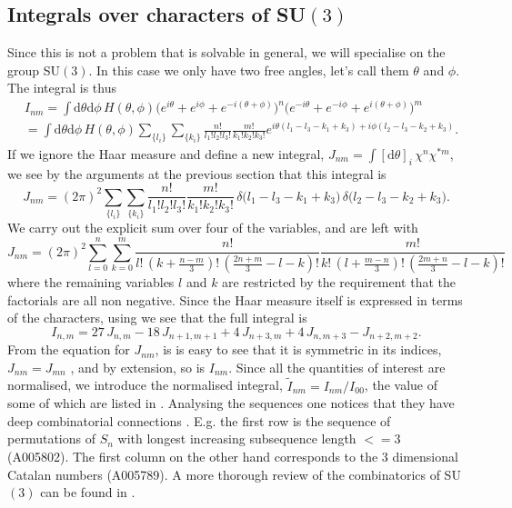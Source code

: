 \subsection{Integrals over characters of SU\texorpdfstring{$(3)$}{(3)}}

Since this is not a problem that is solvable in general, we will specialise on
the group SU$(3)$. In this case we only have two free angles, let's call them
$\theta$ and $\phi$. The integral is thus
%
\begin{align}
  &I_{nm} = \int \mathrm{d} \theta \mathrm{d} \phi \, H(\theta,\phi)
  \big(e^{i\theta} + e^{i\phi} + e^{-i(\theta + \phi)}\big)^n
  \big(e^{-i\theta} + e^{-i\phi} + e^{i(\theta + \phi)}\big)^m \nonumber\\
  &=\int \mathrm{d} \theta \mathrm{d} \phi \, H(\theta,\phi)
  \sum_{\{l_i\}} \sum_{\{k_i\}} \frac{n!}{l_1! l_2! l_3!} \frac{m!}{k_1! k_2!
    k_3!} e^{i \theta (l_1 - l_3 - k_1 + k_3) + i \phi (l_2 - l_3 - k_2 + k_3)}.
\end{align}
%
If we ignore the Haar measure and define a new integral, $J_{nm} = \int
[\mathrm{d} \theta]_i\, \chi^n \chi^{*m}$, we see by the arguments at the previous
section that this integral is
%
\begin{equation}
  J_{nm} = (2\pi)^2 \sum_{\{l_i\}} \sum_{\{k_i\}}
    \frac{n!}{l_1! l_2! l_3!} \frac{m!}{k_1! k_2!k_3!}\,
    \delta\big(l_1 - l_3 - k_1 + k_3\big)\, \delta\big(l_2 - l_3 - k_2 + k_3\big).
\end{equation}
%
We carry out the explicit sum over four of the variables, and are left
with
%
\begin{equation}
  J_{nm} = (2\pi)^2 \sum_{l = 0}^n \sum_{k = 0}^m
    \frac{n!}{l!\, (k + \frac{n-m}{3})!\,(\frac{2n+m}{3} - l - k)!}
    \frac{m!}{k!\, (l + \frac{m-n}{3})!\,(\frac{2m+n}{3} - l - k)!}
\end{equation}
%
where the remaining variables $l$ and $k$ are restricted by the requirement that
the factorials are all non negative. Since the Haar measure itself is expressed
in terms of the characters, using  we see that the
full integral is
%
\begin{equation}
  I_{n,m} = 27\, J_{n,m} - 18\, J_{n+1,m+1} + 4\, J_{n+3,m} + 4\, J_{n,m+3} - J_{n+2,m+2}.
\end{equation}
%
From the equation for $J_{nm}$, is is easy to see that it is symmetric in its
indices, $J_{nm} = J_{mn}$ , and by extension, so is $I_{nm}$. Since all the
quantities of interest are normalised, we introduce the normalised integral,
$\tilde{I}_{nm} = I_{nm} / I_{00}$, the value of some of which are listed in 
. Analysing the sequences one notices that they
have deep combinatorial connections \citep{OEIS}. E.g. the first row is the sequence of
permutations of $S_n$ with longest increasing subsequence length $<=3$
(A005802). The first column on the other hand corresponds to the 3 dimensional
Catalan numbers (A005789). A more thorough review of the combinatorics of
SU$(3)$ can be found in \citep{Unger:2014oga}.

